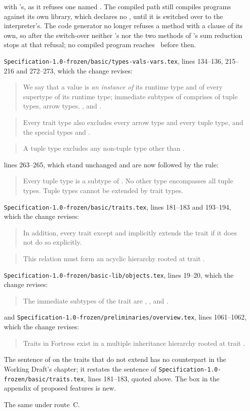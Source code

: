 \begin{description}
with \library's, as it refuses one named .
The compiled path still compiles programs against its own library, which
declares no , until it is switched over to the interpreter's.
The code generator no longer refuses a method with a  clause of
its own, so after the switch-over neither 's 
nor the two  methods of \library's sum reduction stops at that
refusal; no compiled program reaches \library\ before then.
\item[Original text] \nolinkurl{Specification-1.0-frozen/basic/types-vals-vars.tex},
lines 134--136, 215--216 and 272--273, which the change revises:
\begin{quote}
We say that a value is \emph{an instance of} its runtime type and of every
supertype of its runtime type; immediate subtypes of  comprises of
tuple types, arrow types, \TYP{()}, and .
\end{quote}
\begin{quote}
Every trait type also excludes every arrow type and every tuple type, and the
special types \TYP{()} and .
\end{quote}
\begin{quote}
A tuple type excludes any non-tuple type other than .
\end{quote}
lines 263--265, which stand unchanged and are now followed by the rule:
\begin{quote}
Every tuple type is a subtype of . No other type encompasses all tuple
types. Tuple types cannot be extended by trait types.
\end{quote}
\nolinkurl{Specification-1.0-frozen/basic/traits.tex}, lines 181--183 and
193--194, which the change revises:
\begin{quote}
In addition, every trait except  and  implicitly extends
the trait  if it does not do so explicitly.
\end{quote}
\begin{quote}
This relation must form an acyclic hierarchy rooted at trait .
\end{quote}
\nolinkurl{Specification-1.0-frozen/basic-lib/objects.tex}, lines 19--20, which
the change revises:
\begin{quote}
The immediate subtypes of the trait  are , ,
and \TYP{()}.
\end{quote}
and \nolinkurl{Specification-1.0-frozen/preliminaries/overview.tex}, lines
1061--1062, which the change revises:
\begin{quote}
Traits in Fortress exist in a multiple inheritance hierarchy rooted at trait
.
\end{quote}
The sentence of  on the traits that do not extend
 has no counterpart in the Working Draft's chapter; it restates
the sentence of \nolinkurl{Specification-1.0-frozen/basic/traits.tex}, lines
181--183, quoted above.
The box in the appendix of proposed features is new.
\item[Route C] The same under route~C.
\end{description}

